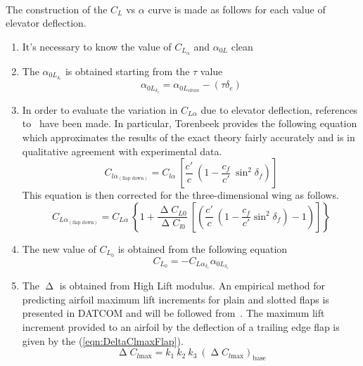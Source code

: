 \noindent \\
The construction of the $C_L$ vs $\alpha$ curve is made as follows for each value of elevator deflection.
\begin{enumerate}
	\item It's necessary to know the value of $C_{L_{\alpha}}$ and $\alpha_{0L}$ clean
	\item The  $\alpha_{{0L}_{\delta_e}}$ is obtained starting from the $\tau$ value
	\begin{equation}
	\alpha_{{0L}_{\delta_e}} = \alpha_{{0L}_{clean}} - (\tau \delta_e)
	\end{equation}
	\item In order to evaluate the variation in $C_{L\alpha}$ due to elevator deflection, references to~\cite{torenbeek1982synthesis} have been made. In particular, Torenbeek provides the following equation which approximates the results of the exact theory fairly accurately and is in qualitative agreement with experimental data. 
	\begin{equation}
	C_{l\alpha_{\left(\text{flap down}\right)}}=C_{l\alpha}\ \left[\dfrac{c'}{c}\ \left(1-\dfrac{c_f}{c'}\ \sin^2\delta_f\right)\right]
	\label{eqn:ClalphaFlap}
	\end{equation}
	\noindent
	This equation is then corrected for the three-dimensional wing as follows.
	\begin{equation}
	C_{L\alpha_{\left(\text{flap down}\right)}}=C_{L\alpha}\ \left\{1+\dfrac{\upDelta C_{L0}}{\upDelta C_{l0}}\ \left[\left(\dfrac{c'}{c}\ \left(1-\dfrac{c_f}{c'}\sin^2\delta_f\right)-1\right)\right]\right\}
	\label{eqn:ClalphaFlap}
	\end{equation}
	\item The new value of $C_{L_0}$ is obtained from the following equation
	\begin{equation}
	C_{L_0} = - C_{L\alpha_{\delta_e}} \alpha_{{0L}_{\delta_e}}
	\end{equation}
	\item The $\upDelta$ is obtained from High Lift modulus. An empirical method for predicting airfoil maximum lift increments for plain and slotted flaps is presented in DATCOM and will be followed from~\cite{sforza2014commercial}.
	The maximum lift increment provided to an airfoil by the deflection of a trailing edge flap is given by the (\ref{eqn:DeltaClmaxFlap}).
	\begin{equation}
	\upDelta C_{l\text{max}}=k_1\ k_2\ k_3\ \left(\upDelta C_{l\text{max}}\right)_{\text{base}}
	\label{eqn:DeltaClmaxFlap}

\end{equation}
\end{enumerate}
